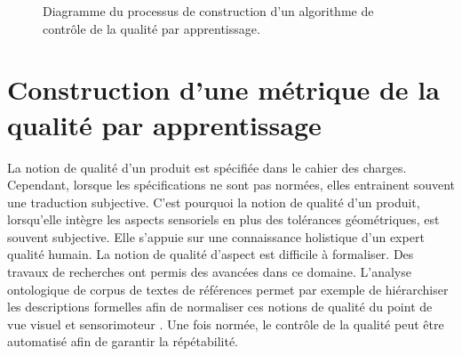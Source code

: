 \begin{figure}[hbtp]
    \caption{Diagramme du processus de construction d'un algorithme de contrôle de la qualité par apprentissage.}
    \label{fig:deep_flowchart}
\end{figure}

\vfill
\newpage

\section{Construction d'une métrique de la qualité par apprentissage} \label{sec:metric_learning}
La notion de qualité d'un produit est spécifiée dans le cahier des charges.
Cependant, lorsque les spécifications ne sont pas normées, elles entrainent souvent une traduction subjective.
C'est pourquoi la notion de qualité d'un produit, lorsqu'elle intègre les aspects sensoriels en plus des tolérances géométriques, est souvent subjective.
Elle s'appuie sur une connaissance holistique d'un expert qualité humain. La notion de qualité d'aspect est difficile à formaliser.
Des travaux de recherches ont permis des avancées dans ce domaine.
L'analyse ontologique de corpus de textes de références permet par exemple de hiérarchiser les descriptions formelles afin de normaliser ces notions de qualité du point de vue visuel \cite{baudet_maitrise_2012} et sensorimoteur \cite{albert_smart_2017}.
Une fois normée, le contrôle de la qualité peut être automatisé \cite{desage_contraintes_2015, pitard_metrologie_2016, lacombe_exploitation_2018a, albert_maitrise_2019} afin de garantir la répétabilité.


